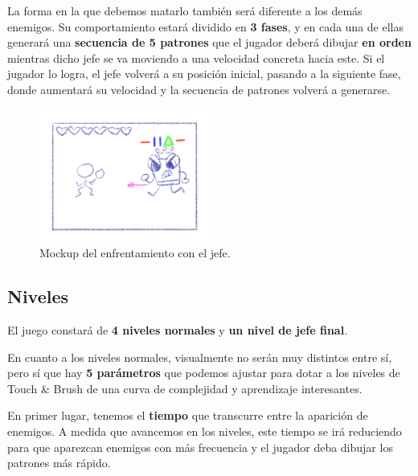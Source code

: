 \vspace{0.5cm}

La forma en la que debemos matarlo también será diferente a los demás enemigos. Su comportamiento estará dividido en \textbf{3 fases}, y en cada una de ellas generará una \textbf{secuencia de 5 patrones} que el jugador deberá dibujar \textbf{en orden} mientras dicho jefe se va moviendo a una velocidad concreta hacia este. Si el jugador lo logra, el jefe volverá a su posición inicial, pasando a la siguiente fase, donde aumentará su velocidad y la secuencia de patrones volverá a generarse.

\vspace{0.5cm}

\begin{figure}[htbp]
\centering
  \includegraphics[width=0.5\textwidth]{archivos/mockup_boss.png}
  \caption{Mockup del enfrentamiento con el jefe.}
  \label{fig:mockup_boss}
\end{figure}

\vspace{1cm}

\subsection{Niveles}

El juego constará de \textbf{4 niveles normales} y \textbf{un nivel de jefe final}.

\vspace{0.5cm}

En cuanto a los niveles normales, visualmente no serán muy distintos entre sí, pero sí que hay \textbf{5 parámetros} que podemos ajustar para dotar a los niveles de Touch \& Brush de una curva de complejidad y aprendizaje interesantes.

\vspace{0.5cm}

En primer lugar, tenemos el \textbf{tiempo} que transcurre entre la aparición de enemigos. A medida que avancemos en los niveles, este tiempo se irá reduciendo para que aparezcan enemigos con más frecuencia y el jugador deba dibujar los patrones más rápido.


